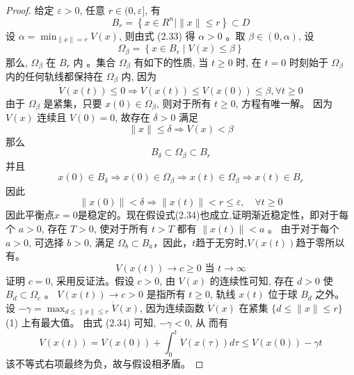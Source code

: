 \begin{proof}
    给定 $\varepsilon>0$, 任意 $r \in(0, \varepsilon]$, 有
    \begin{equation}
        B_r=\left\{x \in R^n \mid\|x\| \leqslant r\right\} \subset D
    \end{equation}
    设 $\alpha=\min _{\|x\|=r} V(x)$, 则由式 (2.33) 得 $\alpha>0$ 。取 $\beta \in(0, \alpha)$, 设
    \begin{equation}
        \Omega_\beta=\left\{x \in B_r \mid V(x) \leqslant \beta\right\}
    \end{equation}
    那么, $\Omega_\beta$ 在 $B_r$ 内  。集合 $\Omega_\beta$ 有如下的性质, 
    当 $t \geqslant 0$ 时, 在 $t=0$ 时刻始于 $\Omega_\beta$ 内的任何轨线都保持在 $\Omega_\beta$ 内,  因为
    \begin{equation}
        \dot{V}(x(t)) \leqslant 0 \Rightarrow V(x(t)) \leqslant V(x(0)) \leqslant \beta, \forall t \geqslant 0
    \end{equation}
    由于 $\Omega_\beta$ 是紧集，只要 $x(0) \in \Omega_\beta$, 则对于所有 $t \geqslant 0$, 方程有唯一解。
    因为 $V(x)$ 连续且 $V(0)=0$, 故存在 $\delta>0$ 满足
    \begin{equation}
        \|x\| \leqslant \delta \Rightarrow V(x)<\beta
    \end{equation}
    那么
    \begin{equation}
        B_\delta \subset \Omega_\beta \subset B_r
    \end{equation}
    并且
    \begin{equation}
        x(0) \in B_\delta \Rightarrow x(0) \in \Omega_\beta \Rightarrow x(t) \in \Omega_\beta \Rightarrow x(t) \in B_r
    \end{equation}
    因此
    \begin{equation}
        \|x(0)\|<\delta \Rightarrow\|x(t)\|<r \leqslant \varepsilon, \quad \forall t \geqslant 0
    \end{equation}
    因此平衡点$x=0$是稳定的。现在假设式(2.34)也成立,证明渐近稳定性，即对于每个 $a>0$, 存在 $T>0$, 使对于所有 $t>T$ 都有 $\|x(t)\|<a$ 。
    由于对于每个 $a>0$, 可选择 $b>0$, 满足 $\Omega_b \subset B_a$，因此，$t$趋于无穷时,$V(x(t))$趋于零所以有。
    \begin{equation}
        V(x(t)) \rightarrow c \geqslant 0 \text { 当 } t \rightarrow \infty
    \end{equation}
    证明 $c=0$, 采用反证法。假设 $c>0$, 由 $V(x)$ 的连续性可知, 存在 $d>0$ 使 $B_d \subset \Omega_c$ 。
    $V(x(t)) \rightarrow c>0$ 是指所有 $t \geqslant 0$, 轨线 $x(t)$ 位于球 $B_d$ 之外。
    设 $-\gamma=\max _{d \leqslant\|x\| \leqslant r} \dot{V}(x)$, 因为连续函数 $\dot{V}(x)$ 在紧集 $\{d \leqslant\|x\| \leqslant r\}$ (1) 上有最大值。
    由式 (2.34) 可知, $-\gamma<0$, 从 而有
    \begin{equation}
        V(x(t))=V(x(0))+\int_0^t \dot{V}(x(\tau)) d \tau \leqslant V(x(0))-\gamma t
    \end{equation}
    该不等式右项最终为负，故与假设相矛盾。
\end{proof}
